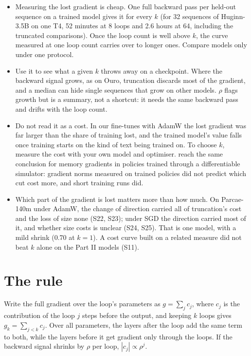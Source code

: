 \documentclass[10pt]{article}
\begin{document}
\begin{itemize}
\item Measuring the lost gradient is cheap. One full backward pass per held-out sequence on a trained model gives it for every $k$ (for 32 sequences of Huginn-3.5B on one T4, 52 minutes at 8 loops and 2.6 hours at 64, including the truncated comparisons). Once the loop count is well above $k$, the curve measured at one loop count carries over to longer ones. Compare models only under one protocol.
\item Use it to see what a given $k$ throws away on a checkpoint. Where the backward signal grows, as on Ouro, truncation discards most of the gradient, and a median can hide single sequences that grow on other models. $\rho$ flags growth but is a summary, not a shortcut: it needs the same backward pass and drifts with the loop count.
\item Do not read it as a cost. In our fine-tunes with AdamW the lost gradient was far larger than the share of training lost, and the trained model's value falls once training starts on the kind of text being trained on. To choose $k$, measure the cost with your own model and optimiser. \citet{li2026policymemory} reach the same conclusion for memory gradients in policies trained through a differentiable simulator: gradient norms measured on trained policies did not predict which cut cost more, and short training runs did.
\item Which part of the gradient is lost matters more than how much. On Parcae-140m under AdamW, the change of direction carried all of truncation's cost and the loss of size none (S22, S23); under SGD the direction carried most of it, and whether size costs is unclear (S24, S25). That is one model, with a mild shrink (0.70 at $k = 1$). A cost curve built on a related measure did not beat $k$ alone on the Part II models (S11).
\end{itemize}




\clearpage
\appendix

\section{The rule}\label{app:A}

Write the full gradient over the loop's parameters as $g = \sum_j c_j$, where $c_j$ is the contribution of the loop $j$ steps before the output, and keeping $k$ loops gives $g_k = \sum_{j<k} c_j$. Over all parameters, the layers after the loop add the same term to both, while the layers before it get gradient only through the loops. If the backward signal shrinks by $\rho$ per loop, $|c_j| \propto \rho^{j}$.
\end{document}

